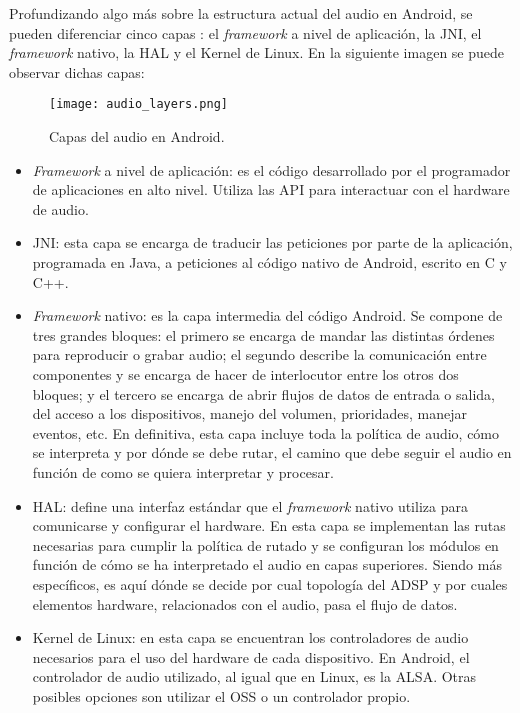 Profundizando algo más sobre la estructura actual del audio en Android, se pueden diferenciar cinco capas \cite{audio_android}: el \textit{framework} a nivel de aplicación, la \gls{JNI}, el \textit{framework} nativo, la \gls{HAL} y el Kernel de Linux. En la siguiente imagen se puede observar dichas capas:

\begin{wrapfigure}{l}{0.47\textwidth}
	\centering
	\texttt{[image: audio\_layers.png]}
	\caption[Capas del audio en Android]{Capas del audio en Android.}
	\label{fig:audio_layers}
\end{wrapfigure}

\hfill

\begin{itemize}
	\item{\textit{Framework} a nivel de aplicación: es el código desarrollado por el programador de aplicaciones en alto nivel. Utiliza las \gls{API} para interactuar con el hardware de audio.}	
	\item{\gls{JNI}: esta capa se encarga de traducir las peticiones por parte de la aplicación, programada en Java, a peticiones al código nativo de Android, escrito en C y C++.}
\end{itemize}

\begin{itemize}
	\item{\textit{Framework} nativo: es la capa intermedia del código Android. Se compone de tres grandes bloques: el primero se encarga de mandar las distintas órdenes para reproducir o grabar audio; el segundo describe la comunicación entre componentes y se encarga de hacer de interlocutor entre los otros dos bloques; y el tercero se encarga de abrir flujos de datos de entrada o salida, del acceso a los dispositivos, manejo del volumen, prioridades, manejar eventos, etc. En definitiva, esta capa incluye toda la política de audio, cómo se interpreta y por dónde se debe rutar, el camino que debe seguir el audio en función de como se quiera interpretar y procesar.}
\end{itemize}

\begin{itemize}
	\item{\gls{HAL}: define una interfaz estándar que el \textit{framework} nativo utiliza para comunicarse y configurar el hardware. En esta capa se implementan las rutas necesarias para cumplir la política de rutado y se configuran los módulos en función de cómo se ha interpretado el audio en capas superiores. Siendo más específicos, es aquí dónde se decide por cual topología del \gls{ADSP} y por cuales elementos hardware, relacionados con el audio, pasa el flujo de datos.}
	\item{Kernel de Linux: en esta capa se encuentran los controladores de audio necesarios para el uso del hardware de cada dispositivo. En Android, el controlador de audio utilizado, al igual que en Linux, es la \gls{ALSA}. Otras posibles opciones son utilizar el \gls{OSS} o un controlador propio.}
\end{itemize}

